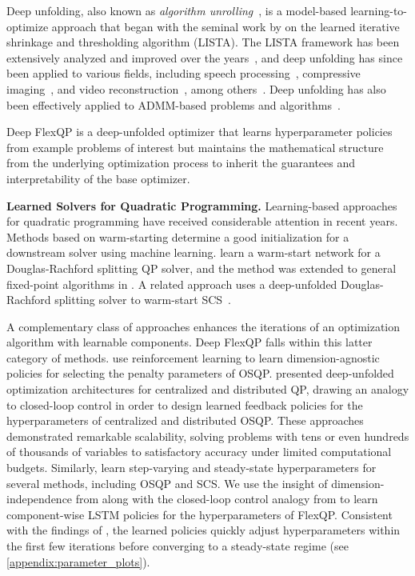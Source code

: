 \documentclass{article} %
\begin{document}
Deep unfolding, also known as \emph{algorithm unrolling}~\citep{monga2021algorithm}, is a model-based learning-to-optimize approach that began with the seminal work by \citet{gregor2010ista} on the learned iterative shrinkage and thresholding algorithm (LISTA).
The LISTA framework has been extensively analyzed and improved over the years~\citep{Moreau2017Understanding,Chen2018Theoretical,liu2019alista,Chen2021Hyperparameter}, and deep unfolding has since been applied to various fields, including speech processing~\citep{Hershey2014Deep,Heigold2016EndToEnd}, compressive imaging~\citep{Zhang2018ISTA,Mardani2018Neural}, and video reconstruction~\citep{Luong2021Designing,deweerdt2024transformer}, among others~\citep{Adler2018Learned,Gupta2018CNN,Solomon2020Deep}.
Deep unfolding has also been effectively applied to ADMM-based problems and algorithms~\citep{Yang2016Deep,Ding2018Domain,Xie2019Differentiable,Yang2020ADMM,saravanos2025deep}.

Deep FlexQP is a deep-unfolded optimizer that learns hyperparameter policies from example problems of interest but maintains the mathematical structure from the underlying optimization process to inherit the guarantees and interpretability of the base optimizer.


\textbf{Learned Solvers for Quadratic Programming.}
Learning-based approaches for quadratic programming have received considerable attention in recent years.
Methods based on warm-starting determine a good initialization for a downstream solver using machine learning.
\citet{sambharya2023end} learn a warm-start network for a Douglas-Rachford splitting QP solver, and the method was extended to general fixed-point algorithms in \citet{Sambharya2024Learning}.
A related approach uses a deep-unfolded Douglas-Rachford splitting solver to warm-start SCS~\citep{xiong2025solving}.

A complementary class of approaches enhances the iterations of an optimization algorithm with learnable components. Deep FlexQP falls within this latter category of methods.
\citet{ichnowski2021accelerating} use reinforcement learning to learn dimension-agnostic policies for selecting the penalty parameters of OSQP. \citet{saravanos2025deep} presented deep-unfolded optimization architectures for centralized and distributed QP, drawing an analogy to closed-loop control in order to design learned feedback policies for the hyperparameters of centralized and distributed OSQP. These approaches demonstrated remarkable scalability, solving problems with tens or even hundreds of thousands of variables to satisfactory accuracy under limited computational budgets.
Similarly, \citet{Sambharya2024LearningAlgorithm} learn step-varying and steady-state hyperparameters for several methods, including OSQP and SCS.
We use the insight of dimension-independence from \citet{ichnowski2021accelerating} along with the closed-loop control analogy from \citet{saravanos2025deep} to learn component-wise LSTM policies for the hyperparameters of FlexQP.
Consistent with the findings of
\citet{Sambharya2024LearningAlgorithm}, the learned policies
quickly adjust hyperparameters within the first few iterations
before converging to a steady-state regime (see \cref{appendix:parameter_plots}).
\end{document}
